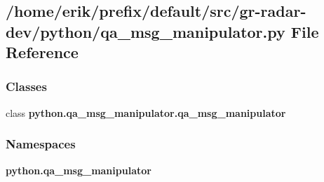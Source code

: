 \subsection{/home/erik/prefix/default/src/gr-\/radar-\/dev/python/qa\+\_\+msg\+\_\+manipulator.py File Reference}
\label{qa__msg__manipulator_8py}
\subsubsection*{Classes}
\begin{DoxyCompactItemize}
\item 
class {\bf python.\+qa\+\_\+msg\+\_\+manipulator.\+qa\+\_\+msg\+\_\+manipulator}
\end{DoxyCompactItemize}
\subsubsection*{Namespaces}
\begin{DoxyCompactItemize}
\item 
 {\bf python.\+qa\+\_\+msg\+\_\+manipulator}
\end{DoxyCompactItemize}
